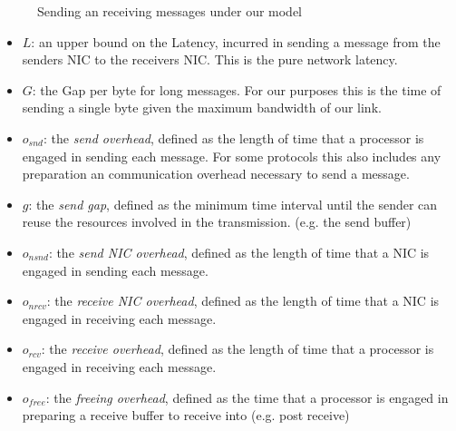 \begin{figure}[!htp]
\begin{center}
\end{center}
\caption{Sending an receiving messages under our model}
\label{fig:model-base}
\end{figure}




\begin{itemize}
  \item $L$: an upper bound on the Latency, incurred in sending a message from the senders NIC to the receivers NIC. This is
    the pure network latency.
  \item $G$: the Gap per byte for long messages. For our purposes this is the time of sending a single byte given the 
    maximum bandwidth of our link.
  \item $o_{snd}$: the \emph{send overhead}, defined as the length of time that a processor is engaged in sending each message.
    For some protocols this also includes any preparation an communication overhead necessary to send a message.
  \item $g$: the \emph{send gap}, defined as the minimum time interval until the sender can reuse the resources involved in 
    the transmission. (e.g. the send buffer) 
  \item $o_{nsnd}$: the \emph{send NIC overhead}, defined as the length of time that a NIC is engaged in sending each message.
  \item $o_{nrcv}$: the \emph{receive NIC overhead}, defined as the length of time that a NIC is engaged in receiving each message.
  \item $o_{rcv}$: the \emph{receive overhead}, defined as the length of time that a processor is engaged in receiving each message.
  \item $o_{free}$: the \emph{freeing overhead}, defined as the time that a processor is engaged in preparing a receive buffer
    to receive into (e.g. post receive)
\end{itemize}


